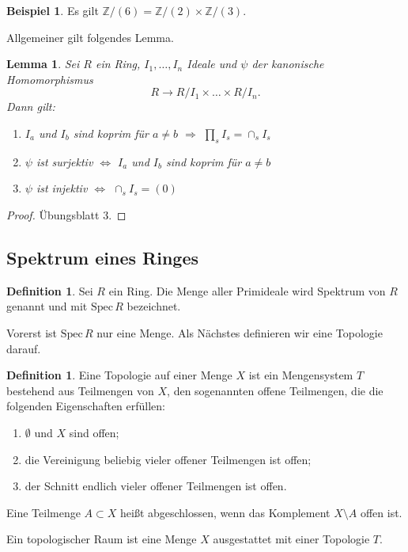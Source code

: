 \documentclass[reqno,12pt]{article}
\numberwithin{equation}{section}
\newcommand{\bZ}{\mathbb{Z}}
\newcommand{\Spec}{\text{Spec}\,}
\theoremstyle{plain}
\newtheorem{lemma}[thm]{Lemma}
\theoremstyle{definition}
\newtheorem{definition}[thm]{Definition}
\newtheorem{example}[thm]{Beispiel}
\begin{document}
\begin{example}
Es gilt $\bZ / (6) = \bZ/(2) \times \bZ/(3)$.
\end{example}

Allgemeiner gilt folgendes Lemma.

\begin{lemma}
  Sei $R$ ein Ring, $I_1, \dots, I_n$ Ideale und $\psi$ der kanonische Homomorphismus
  $$
  R \to R/I_1 \times \dots \times R/I_n.
  $$
  Dann gilt:
  \begin{enumerate}
    \item $I_a$ und $I_b$ sind koprim für $a \neq b$ $\Rightarrow$ $\prod_s I_s =  \cap_s I_s$
    \item $\psi$ ist surjektiv $\iff$ $I_a$ und $I_b$ sind koprim für $a \neq b$
    \item $\psi$ ist injektiv $\iff$ $\cap_s I_s = (0)$
  \end{enumerate}
\end{lemma}
\begin{proof}
  Übungsblatt 3.
\end{proof}



\subsection{Spektrum eines Ringes}\label{subsection-Spektrum}

\begin{definition}
Sei $R$ ein Ring. Die Menge aller Primideale wird {\sf Spektrum} von $R$ genannt und mit $\Spec R$ bezeichnet.
\end{definition}
Vorerst ist $\Spec R$ nur eine Menge. Als Nächstes definieren wir eine Topologie darauf.

\begin{definition}
  Eine {\sf Topologie} auf einer Menge $X$ ist ein Mengensystem $T$ bestehend aus Teilmengen von $X$, den sogenannten {\sf offene Teilmengen}, die die folgenden Eigenschaften erfüllen:
  \begin{enumerate}
    \item $\emptyset$ und $X$ sind offen;
    \item die Vereinigung beliebig vieler offener Teilmengen ist offen;
    \item der Schnitt endlich vieler offener Teilmengen ist offen.
  \end{enumerate}

  Eine Teilmenge $A \subset X$ heißt {\sf abgeschlossen}, wenn das Komplement $X \setminus A$ offen ist.

  \medskip

  Ein {\sf topologischer Raum} ist eine Menge $X$ ausgestattet mit einer Topologie $T$.
\end{definition}
\end{document}
